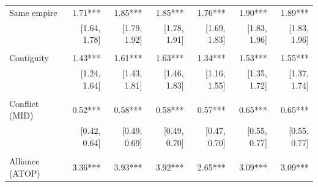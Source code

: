\begin{table}[!h]
\begin{tabular}{lllllll}
\multicolumn{1}{l}{Same empire} &
  \multicolumn{1}{|r}{1.71***} &
  \multicolumn{1}{r}{1.85***} &
  \multicolumn{1}{r}{1.85***} &
  \multicolumn{1}{r}{1.76***} &
  \multicolumn{1}{r}{1.90***} &
  \multicolumn{1}{r}{1.89***} \\
\multicolumn{1}{l}{} &
  \multicolumn{1}{|r}{[1.64,    1.78]} &
  \multicolumn{1}{r}{[1.79,    1.92]} &
  \multicolumn{1}{r}{[1.78,    1.91]} &
  \multicolumn{1}{r}{[1.69,    1.83]} &
  \multicolumn{1}{r}{[1.83,    1.96]} &
  \multicolumn{1}{r}{[1.83,    1.96]} \\
\multicolumn{1}{l}{} &
  \multicolumn{1}{|r}{} &
  \multicolumn{1}{r}{} &
  \multicolumn{1}{r}{} &
  \multicolumn{1}{r}{} &
  \multicolumn{1}{r}{} &
  \multicolumn{1}{r}{} \\
\multicolumn{1}{l}{Contiguity} &
  \multicolumn{1}{|r}{1.43***} &
  \multicolumn{1}{r}{1.61***} &
  \multicolumn{1}{r}{1.63***} &
  \multicolumn{1}{r}{1.34***} &
  \multicolumn{1}{r}{1.53***} &
  \multicolumn{1}{r}{1.55***} \\
\multicolumn{1}{l}{} &
  \multicolumn{1}{|r}{[1.24,    1.64]} &
  \multicolumn{1}{r}{[1.43,    1.81]} &
  \multicolumn{1}{r}{[1.46,    1.83]} &
  \multicolumn{1}{r}{[1.16,    1.55]} &
  \multicolumn{1}{r}{[1.35,    1.72]} &
  \multicolumn{1}{r}{[1.37,    1.74]} \\
\multicolumn{1}{l}{} &
  \multicolumn{1}{|r}{} &
  \multicolumn{1}{r}{} &
  \multicolumn{1}{r}{} &
  \multicolumn{1}{r}{} &
  \multicolumn{1}{r}{} &
  \multicolumn{1}{r}{} \\
\multicolumn{1}{l}{Conflict (MID)} &
  \multicolumn{1}{|r}{0.52***} &
  \multicolumn{1}{r}{0.58***} &
  \multicolumn{1}{r}{0.58***} &
  \multicolumn{1}{r}{0.57***} &
  \multicolumn{1}{r}{0.65***} &
  \multicolumn{1}{r}{0.65***} \\
\multicolumn{1}{l}{} &
  \multicolumn{1}{|r}{[0.42,    0.64]} &
  \multicolumn{1}{r}{[0.49,    0.69]} &
  \multicolumn{1}{r}{[0.49,    0.70]} &
  \multicolumn{1}{r}{[0.47,    0.70]} &
  \multicolumn{1}{r}{[0.55,    0.77]} &
  \multicolumn{1}{r}{[0.55,    0.77]} \\
\multicolumn{1}{l}{} &
  \multicolumn{1}{|r}{} &
  \multicolumn{1}{r}{} &
  \multicolumn{1}{r}{} &
  \multicolumn{1}{r}{} &
  \multicolumn{1}{r}{} &
  \multicolumn{1}{r}{} \\
\multicolumn{1}{l}{Alliance (ATOP)} &
  \multicolumn{1}{|r}{3.36***} &
  \multicolumn{1}{r}{3.93***} &
  \multicolumn{1}{r}{3.92***} &
  \multicolumn{1}{r}{2.65***} &
  \multicolumn{1}{r}{3.09***} &
  \multicolumn{1}{r}{3.09***} \\

\end{tabular}
\end{table}

